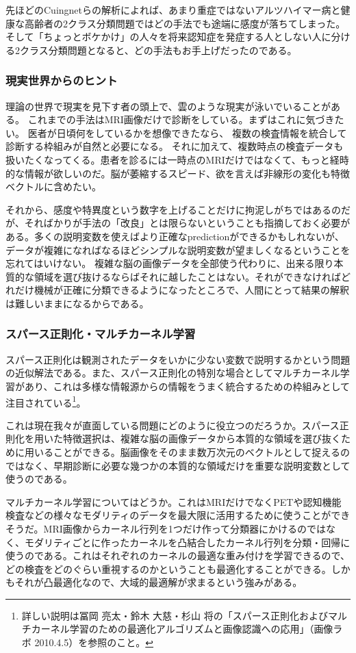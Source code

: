 先ほどのCuingnetらの解析によれば、あまり重症ではないアルツハイマー病と健康な高齢者の2クラス分類問題ではどの手法でも途端に感度が落ちてしまった。そして「ちょっとボケかけ」の人々を将来認知症を発症する人としない人に分ける2クラス分類問題となると、どの手法もお手上げだったのである。

\subsubsection{現実世界からのヒント}
理論の世界で現実を見下す者の頭上で、雲のような現実が泳いでいることがある。
これまでの手法はMRI画像だけで診断をしている。まずはこれに気づきたい。
医者が日頃何をしているかを想像できたなら、
複数の検査情報を統合して診断する枠組みが自然と必要になる。
それに加えて、複数時点の検査データも扱いたくなってくる。患者を診るには一時点のMRIだけではなくて、もっと経時的な情報が欲しいのだ。脳が萎縮するスピード、欲を言えば非線形の変化も特徴ベクトルに含めたい。

それから、感度や特異度という数字を上げることだけに拘泥しがちではあるのだが、そればかりが手法の「改良」とは限らないということも指摘しておく必要がある。多くの説明変数を使えばより正確なpredictionができるかもしれないが、データが複雑になればなるほどシンプルな説明変数が望ましくなるということを忘れてはいけない。
複雑な脳の画像データを全部使う代わりに、出来る限り本質的な領域を選び抜けるならばそれに越したことはない。それができなければどれだけ機械が正確に分類できるようになったところで、人間にとって結果の解釈は難しいままになるからである。

\subsubsection{スパース正則化・マルチカーネル学習}
スパース正則化は観測されたデータをいかに少ない変数で説明するかという問題の近似解法である。また、スパース正則化の特別な場合としてマルチカーネル学習があり、これは多様な情報源からの情報をうまく統合するための枠組みとして注目されている\footnote{詳しい説明は冨岡 亮太・鈴木 大慈・杉山 将の「スパース正則化およびマルチカーネル学習のための最適化アルゴリズムと画像認識への応用」（画像ラボ 2010.4.5）を参照のこと。}。

これは現在我々が直面している問題にどのように役立つのだろうか。スパース正則化を用いた特徴選択は、複雑な脳の画像データから本質的な領域を選び抜くために用いることができる。脳画像をそのまま数万次元のベクトルとして捉えるのではなく、早期診断に必要な幾つかの本質的な領域だけを重要な説明変数として使うのである。

マルチカーネル学習についてはどうか。これはMRIだけでなくPETや認知機能検査などの様々なモダリティのデータを最大限に活用するために使うことができそうだ。MRI画像からカーネル行列を1つだけ作って分類器にかけるのではなく、モダリティごとに作ったカーネルを凸結合したカーネル行列を分類・回帰に使うのである。これはそれぞれのカーネルの最適な重み付けを学習できるので、どの検査をどのぐらい重視するのかということも最適化することができる。しかもそれが凸最適化なので、大域的最適解が求まるという強みがある。
